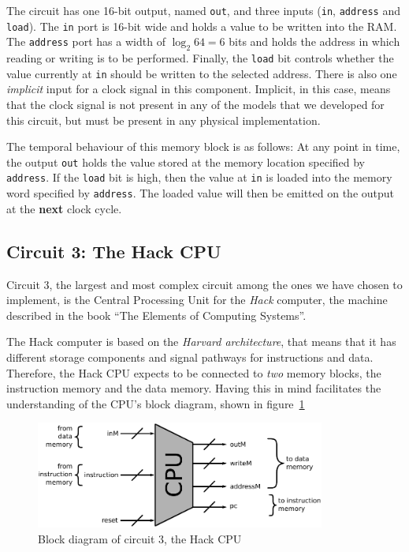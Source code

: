         The circuit has one 16-bit output, named \texttt{out}, and three inputs (\texttt{in},
        \texttt{address} and \texttt{load}). The \texttt{in} port is 16-bit wide and holds a value
        to be written into the RAM. The \texttt{address} port has a width of $\log_{2} 64 = 6$ bits
        and holds the address in which reading or writing is to be performed. Finally, the
        \texttt{load} bit controls whether the value currently at \texttt{in} should be written to
        the selected address. There is also one \emph{implicit} input for a clock signal in this
        component.  Implicit, in this case, means that the clock signal is not present in any of the
        models that we developed for this circuit, but must be present in any physical
        implementation.

        The temporal behaviour of this memory block is as follows: At any point in time, the output
        \texttt{out} holds the value stored at the memory location specified by \texttt{address}.
        If the \texttt{load} bit is high, then the value at \texttt{in} is loaded into the memory
        word specified by \texttt{address}. The loaded value will then be emitted on the output at
        the \textbf{next} clock cycle.

    \subsection{Circuit 3: The Hack CPU}
    \label{subsec:hack-cpu-circuit}

        Circuit 3, the largest and most complex circuit among the ones we have chosen to implement,
        is the Central Processing Unit for the \emph{Hack} computer, the machine described in the
        book ``The Elements of Computing Systems''\cite{nand2tetris-book}.

        The Hack computer is based on the \emph{Harvard architecture}, that means that it has
        different storage components and signal pathways for instructions and data. Therefore, the
        Hack CPU expects to be connected to \emph{two} memory blocks, the instruction memory and the
        data memory. Having this in mind facilitates the understanding of the CPU's block diagram,
        shown in figure~\ref{fig:cpu-block}

        \begin{figure}[H]
            \centerline{\includegraphics[width=0.85\textwidth]{imgs/cpu-block.pdf}}
            \caption{Block diagram of circuit 3, the Hack CPU
                \label{fig:cpu-block}}
        \end{figure}

